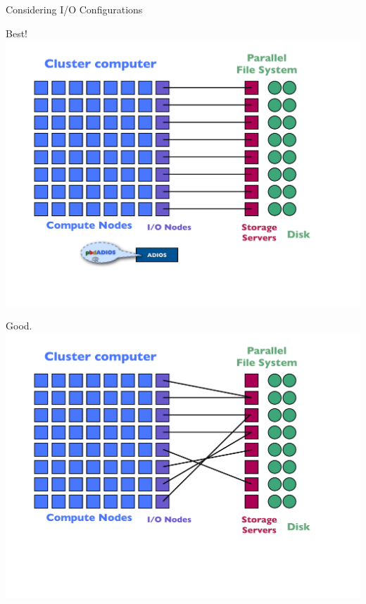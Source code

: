 \begin{frame}{Considering I/O Configurations}
\vspace{-1em}
  \begin{minipage}{0.32\textwidth}
    \begin{block}{Best!}
      \includegraphics[trim=0 120 30 40,clip,width=1\textwidth]{../common/pics/hardware/ParallelHardware20.pdf}
    \end{block}
  \end{minipage}\hspace{1ex}
  \begin{minipage}{0.32\textwidth}
    \begin{block}{Good.}
      \includegraphics[trim=0 120 30 40,clip,width=1\textwidth]{../common/pics/hardware/ParallelHardware19.pdf}

\end{block}
\end{minipage}
\end{frame}
